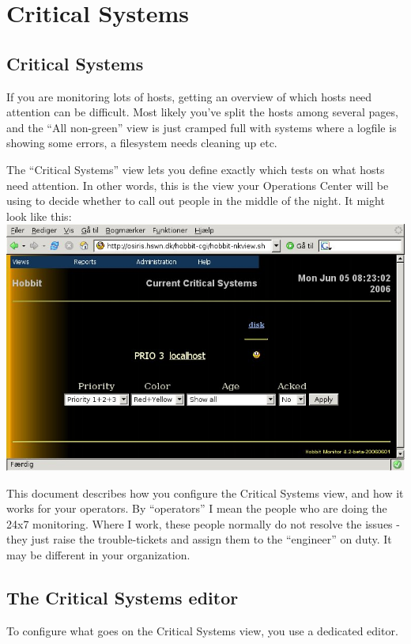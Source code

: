\chapter{Critical Systems}
\label{chap:Critical Systems}

\section*{Critical Systems}


 If you are monitoring lots of hosts, getting an overview of which hosts need attention can be difficult. Most likely you've split the hosts among several pages, and the ``All non-green'' view is just cramped full with systems where a logfile is showing some errors, a filesystem needs cleaning up etc.


 The ``Critical Systems'' view lets you define exactly which tests on what hosts need attention. In other words, this is the view your Operations Center will be using to decide whether to call out people in the middle of the night. It might look like this: \includegraphics[scale=1]{./critview-disk.png} 


 This document describes how you configure the Critical Systems view, and how it works for your operators. By ``operators'' I mean the people who are doing the 24x7 monitoring. Where I work, these people normally do not resolve the issues - they just raise the trouble-tickets and assign them to the ``engineer'' on duty. It may be different in your organization.
\section*{The Critical Systems editor}


 To configure what goes on the Critical Systems view, you use a dedicated editor.


